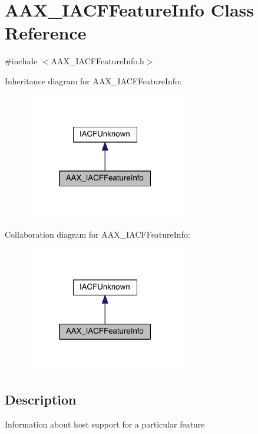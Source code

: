 \hypertarget{a00065}{}\section{A\+A\+X\+\_\+\+I\+A\+C\+F\+Feature\+Info Class Reference}
\label{a00065}


{\ttfamily \#include $<$A\+A\+X\+\_\+\+I\+A\+C\+F\+Feature\+Info.\+h$>$}



Inheritance diagram for A\+A\+X\+\_\+\+I\+A\+C\+F\+Feature\+Info\+:
\nopagebreak
\begin{figure}[H]
\begin{center}
\leavevmode
\includegraphics[width=196pt]{a00538}
\end{center}
\end{figure}


Collaboration diagram for A\+A\+X\+\_\+\+I\+A\+C\+F\+Feature\+Info\+:
\nopagebreak
\begin{figure}[H]
\begin{center}
\leavevmode
\includegraphics[width=196pt]{a00539}
\end{center}
\end{figure}


\subsection{Description}
Information about host support for a particular feature

